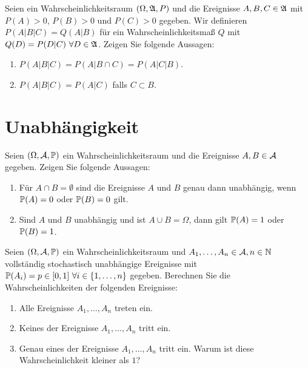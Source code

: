 Seien ein Wahrscheinlichkeitsraum $(\Omega, \mathfrak A, P)$ und die Ereignisse
$A,B,C\in\mathfrak A$ mit $P(A)>0$, $P(B)>0$ und $P(C)>0$ gegeben. Wir definieren
$P(A|B|C)= Q(A|B)$ für ein Wahrscheinlichkeitsmaß $Q$ mit $Q(D)=P(D|C) \ \forall
D\in\mathfrak A$. Zeigen Sie folgende Aussagen:
\begin{enumerate}
    \item $P(A|B|C) = P(A| B \cap C) = P(A|C|B)$. 
    \item $P(A|B|C) = P(A| C)$ falls $C \subset B$.
\end{enumerate}



\section{Unabhängigkeit}

 Seien $(\Omega, \mathcal A, \mathbb P)$ ein
Wahrscheinlichkeitsraum und die Ereignisse $A,B \in \mathcal A$ gegeben. Zeigen Sie
folgende Aussagen:
\begin{enumerate}
    \item Für $A\cap B=\emptyset$ sind die Ereignisse $A$ und $B$ genau dann
        unabhängig, wenn $\mathbb P(A)=0$ oder $\mathbb P(B)=0$ gilt.

    \item Sind $A$ und $B$ unabhängig und ist $A \cup B = \Omega$, dann gilt
        $\mathbb P(A)=1$ oder $\mathbb P(B)=1$. 
\end{enumerate}


 Seien $(\Omega,
\mathcal A, \mathbb P)$ ein Wahrscheinlichkeitsraum und $A_1,\dots, A_n \in\mathcal A, n\in\mathbb N$
vollständig stochastisch unabhängige Ereignisse mit $\mathbb P(A_i)=p\in[0,1]\ \forall
i\in \left\{ 1,\dots,n \right\}$ gegeben. Berechnen Sie die
Wahrscheinlichkeiten der folgenden Ereignisse:
\begin{enumerate}
    \item Alle Ereignisse $A_1,\dots, A_n$ treten ein.
    \item Keines der Ereignisse $A_1, \dots, A_n$ tritt ein. 
    \item Genau eines der Ereignisse $A_1, \dots, A_n$ tritt ein. Warum 
        ist diese Wahrscheinlichkeit kleiner als $1$?
\end{enumerate}

